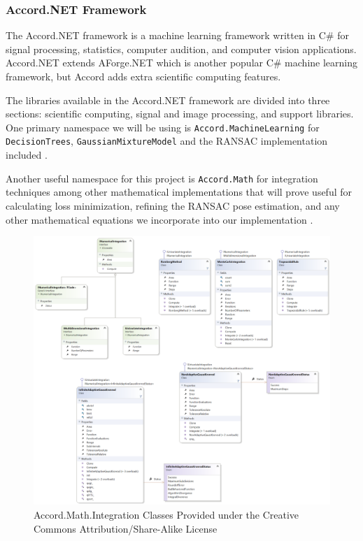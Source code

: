 \documentclass[12pt]{article}
\begin{document}
\subsubsection{Accord.NET Framework}\label{accord.net-framework}

The Accord.NET framework is a machine learning framework written in C\#
for signal processing, statistics, computer audition, and computer
vision applications. Accord.NET extends AForge.NET which is another
popular C\# machine learning framework, but Accord adds extra scientific
computing features.

The libraries available in the Accord.NET framework are divided into
three sections: scientific computing, signal and image processing, and
support libraries. One primary namespace we will be using is
\texttt{Accord.MachineLearning} for \texttt{DecisionTrees},
\texttt{GaussianMixtureModel} and the RANSAC implementation included
\autocite{accord}.

Another useful namespace for this project is \texttt{Accord.Math} for
integration techniques among other mathematical implementations that
will prove useful for calculating loss minimization, refining the RANSAC
pose estimation, and any other mathematical equations we incorporate
into our implementation \autocite{accord}.

\begin{figure}
\centering
\includegraphics{Pictures/Accord.Math.Integration.png}
\caption{Accord.Math.Integration Classes Provided under the Creative
Commons Attribution/Share-Alike License}
\end{figure}
\end{document}
